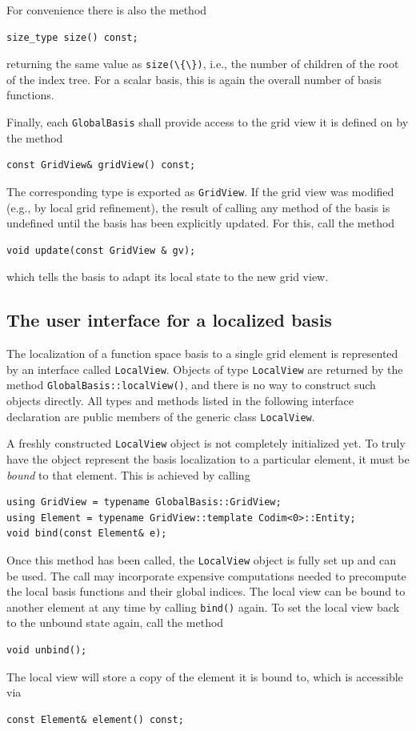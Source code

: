 \documentclass[a4paper,10pt,headings=normal,bibliography=totoc]{scrartcl}
\newcommand{\cpp}[1]{\lstinline[basicstyle=\ttfamily]!#1!}
\begin{document}
For convenience there is also the method
\begin{lstlisting}[style=Interface]
size_type size() const;
\end{lstlisting}
returning the same value as \cpp{size(\{\})}, i.e., the number of children of the root of
the index tree.
For a scalar basis, this is again the overall number of basis functions.

Finally, each \cpp{GlobalBasis} shall provide access to the grid view it is defined on
by the method
\begin{lstlisting}[style=Interface]
const GridView& gridView() const;
\end{lstlisting}
The corresponding type
is exported as \cpp{GridView}. If the grid view
was modified (e.g., by local grid refinement), the result of calling any
method of the basis is undefined until the basis has been explicitly updated.
For this, call the method
\begin{lstlisting}[style=Interface]
void update(const GridView & gv);
\end{lstlisting}
which tells the basis to adapt its local state to the new grid view.


\subsection{The user interface for a localized basis}
\label{sec:localview_interface}

The localization of a function space basis to a single grid element is represented
by an interface called \cpp{LocalView}. Objects of type
\cpp{LocalView} are returned by the method \cpp{GlobalBasis::localView()},
and there is no way to construct such objects directly.
All types and methods listed in the following
interface declaration are public members of
the generic class \cpp{LocalView}.

A freshly constructed \cpp{LocalView} object is not completely initialized yet.
To truly have the object represent the basis localization to a particular element,
it must be \emph{bound} to that element.  This is achieved by calling
\begin{lstlisting}[style=Interface]
using GridView = typename GlobalBasis::GridView;
using Element = typename GridView::template Codim<0>::Entity;
void bind(const Element& e);
\end{lstlisting}
Once this method has been called, the \cpp{LocalView} object is fully set up
and can be used.
The call may incorporate expensive computations needed to
precompute the local basis functions and their global indices.
The local view can be
bound to another element at any time by calling \cpp{bind()} again.
To set the local view back to the unbound state again, call the method
\begin{lstlisting}[style=Interface]
void unbind();
\end{lstlisting}
The local view will store a copy of the
element it is bound to, which is accessible via
\begin{lstlisting}[style=Interface]
const Element& element() const;
\end{lstlisting}
\end{document}
